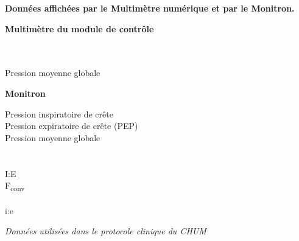 \def\ptitle#1{%
\vspace{.0\baselineskip}\raggedright\textbf{#1}\par\vspace{.8\baselineskip}%
}

	\begin{wide}
\begin{framed}
	\tikzexternaldisable
	\ptitle{Données affichées par le Multimètre numérique et par le Monitron. }
	\begin{minipage}[t]{0.49\textwidth}
	\ptitle{Multimètre du module de contrôle }
	\\
	\\
	Pression moyenne globale\\
\end{minipage}
\begin{minipage}[t]{0.49\textwidth}
	\ptitle{Monitron}
	\raggedright
	Pression inspiratoire de crête\\
	Pression expiratoire de crête (PEP)\\
	Pression moyenne globale\\
	\\
	\\
	I:E\\
	F\textsubscript{conv}\\
	\\
	i:e
\end{minipage}

	\vspace{\baselineskip}
	{\small *\protochum{}\space \emph{Données utilisées dans le
	protocole clinique du CHUM}}
	\tikzexternalenable
\end{framed}
\end{wide}
